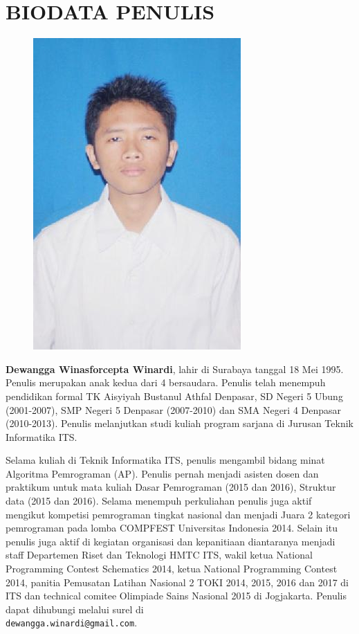 \chapter{BIODATA PENULIS}
\begin{figure}
\includegraphics[height=0.3\textheight]{biodata/pas_foto.jpg}
\end{figure}

\textbf{Dewangga Winasforcepta Winardi}, lahir di Surabaya tanggal 18 Mei 1995. Penulis merupakan anak kedua dari 4 bersaudara. Penulis telah menempuh pendidikan formal TK Aisyiyah Bustanul Athfal Denpasar, SD Negeri 5 Ubung (2001-2007), SMP Negeri 5 Denpasar (2007-2010) dan SMA Negeri 4 Denpasar (2010-2013). Penulis melanjutkan studi kuliah program sarjana di Jurusan Teknik Informatika ITS. 

Selama kuliah di Teknik Informatika ITS, penulis mengambil bidang minat Algoritma Pemrograman (AP). Penulis pernah menjadi asisten dosen dan praktikum untuk mata kuliah Dasar Pemrograman (2015 dan 2016), Struktur data (2015 dan 2016). Selama menempuh perkuliahan penulis juga aktif mengikut kompetisi pemrograman tingkat nasional dan menjadi Juara 2 kategori pemrograman pada lomba COMPFEST Universitas Indonesia 2014. Selain itu penulis juga aktif di kegiatan organisasi dan kepanitiaan diantaranya menjadi staff Departemen Riset dan Teknologi HMTC ITS, wakil ketua National Programming Contest Schematics 2014, ketua National Programming Contest 2014, panitia Pemusatan Latihan Nasional 2 TOKI 2014, 2015, 2016 dan 2017 di ITS dan technical comitee Olimpiade Sains Nasional 2015 di Jogjakarta. Penulis dapat dihubungi melalui surel di \\ \texttt{dewangga.winardi@gmail.com}.
